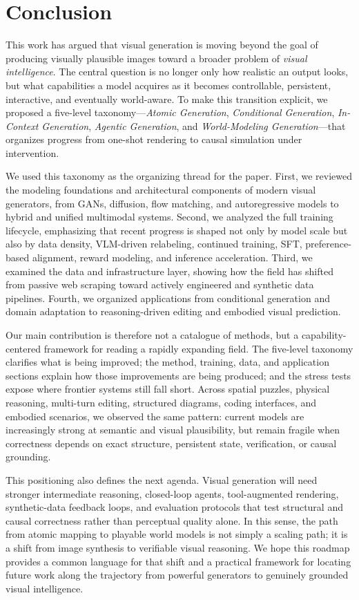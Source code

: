 \section{Conclusion}\label{sec:conclusion}

This work has argued that visual generation is moving beyond the goal of producing visually plausible images toward a broader problem of \emph{visual intelligence}. The central question is no longer only how realistic an output looks, but what capabilities a model acquires as it becomes controllable, persistent, interactive, and eventually world-aware. To make this transition explicit, we proposed a five-level taxonomy---\emph{Atomic Generation}, \emph{Conditional Generation}, \emph{In-Context Generation}, \emph{Agentic Generation}, and \emph{World-Modeling Generation}---that organizes progress from one-shot rendering to causal simulation under intervention.

We used this taxonomy as the organizing thread for the paper. First, we reviewed the modeling foundations and architectural components of modern visual generators, from GANs, diffusion, flow matching, and autoregressive models to hybrid and unified multimodal systems. Second, we analyzed the full training lifecycle, emphasizing that recent progress is shaped not only by model scale but also by data density, VLM-driven relabeling, continued training, SFT, preference-based alignment, reward modeling, and inference acceleration. Third, we examined the data and infrastructure layer, showing how the field has shifted from passive web scraping toward actively engineered and synthetic data pipelines. Fourth, we organized applications from conditional generation and domain adaptation to reasoning-driven editing and embodied visual prediction.

Our main contribution is therefore not a catalogue of methods, but a capability-centered framework for reading a rapidly expanding field. The five-level taxonomy clarifies what is being improved; the method, training, data, and application sections explain how those improvements are being produced; and the stress tests expose where frontier systems still fall short. Across spatial puzzles, physical reasoning, multi-turn editing, structured diagrams, coding interfaces, and embodied scenarios, we observed the same pattern: current models are increasingly strong at semantic and visual plausibility, but remain fragile when correctness depends on exact structure, persistent state, verification, or causal grounding.

This positioning also defines the next agenda. Visual generation will need stronger intermediate reasoning, closed-loop agents, tool-augmented rendering, synthetic-data feedback loops, and evaluation protocols that test structural and causal correctness rather than perceptual quality alone. In this sense, the path from atomic mapping to playable world models is not simply a scaling path; it is a shift from image synthesis to verifiable visual reasoning. We hope this roadmap provides a common language for that shift and a practical framework for locating future work along the trajectory from powerful generators to genuinely grounded visual intelligence.